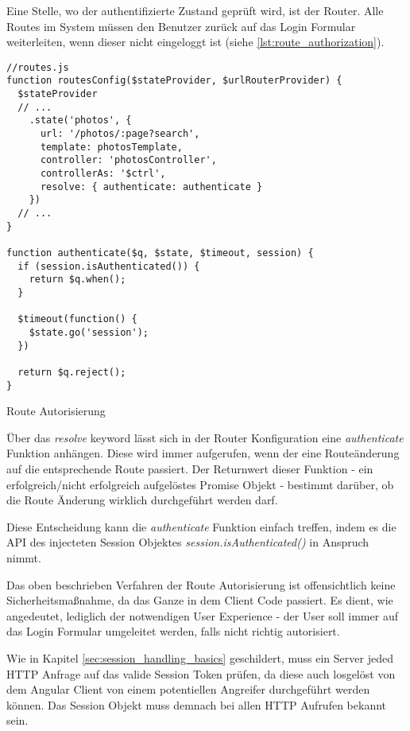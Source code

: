 Eine Stelle, wo der authentifizierte Zustand geprüft wird, ist der Router. Alle Routes im System müssen den Benutzer zurück auf das Login Formular weiterleiten, wenn dieser nicht eingeloggt ist (siehe \ref{lst:route_authorization}).

\begin{listing}[H]
\begin{verbatim}
//routes.js
function routesConfig($stateProvider, $urlRouterProvider) {
  $stateProvider
  // ...
    .state('photos', {
      url: '/photos/:page?search',
      template: photosTemplate,
      controller: 'photosController',
      controllerAs: '$ctrl',
      resolve: { authenticate: authenticate }
    })
  // ... 
}

function authenticate($q, $state, $timeout, session) {
  if (session.isAuthenticated()) {
    return $q.when();
  }

  $timeout(function() {
    $state.go('session');
  })

  return $q.reject();
}

\end{verbatim}
\caption{Route Autorisierung}
\label{lst:route_authorization}
\end{listing}

Über das \textit{resolve} keyword lässt sich in der Router Konfiguration eine \textit{authenticate} Funktion anhängen. Diese wird immer aufgerufen, wenn der eine Routeänderung auf die entsprechende Route passiert. Der Returnwert dieser Funktion - ein erfolgreich/nicht erfolgreich aufgelöstes Promise Objekt - bestimmt darüber, ob die Route Änderung wirklich durchgeführt werden darf.

Diese Entscheidung kann die \textit{authenticate} Funktion einfach treffen, indem es die API des injecteten Session Objektes \textit{session.isAuthenticated()} in Anspruch nimmt.

Das oben beschrieben Verfahren der Route Autorisierung ist offensichtlich keine Sicherheitsmaßnahme, da das Ganze in dem Client Code passiert. Es dient, wie angedeutet, lediglich der notwendigen User Experience - der User soll immer auf das Login Formular umgeleitet werden, falls nicht richtig autorisiert. 

Wie in Kapitel \ref{sec:session_handling_basics} geschildert, muss ein Server jeded HTTP Anfrage auf das valide Session Token prüfen, da diese auch losgelöst von dem Angular Client von einem potentiellen Angreifer durchgeführt werden können. Das Session Objekt muss demnach bei allen HTTP Aufrufen bekannt sein. 

